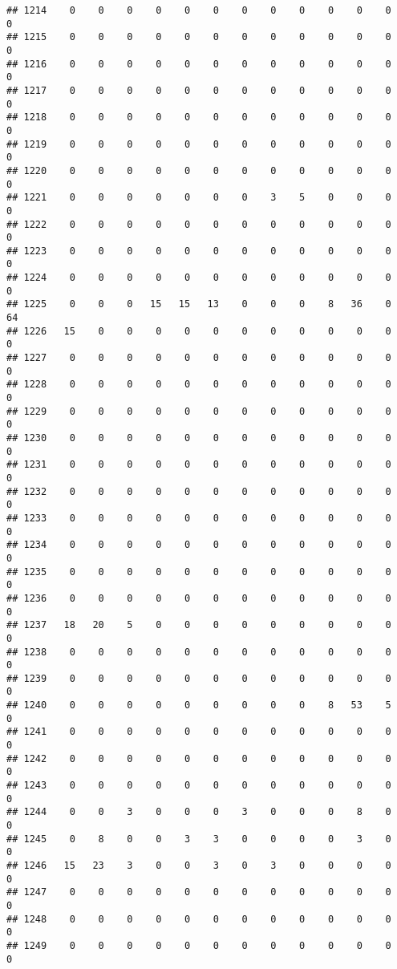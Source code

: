 \documentclass[]{article}
\begin{document}
\begin{verbatim}
## 1214    0    0    0    0    0    0    0    0    0    0    0    0    0
## 1215    0    0    0    0    0    0    0    0    0    0    0    0    0
## 1216    0    0    0    0    0    0    0    0    0    0    0    0    0
## 1217    0    0    0    0    0    0    0    0    0    0    0    0    0
## 1218    0    0    0    0    0    0    0    0    0    0    0    0    0
## 1219    0    0    0    0    0    0    0    0    0    0    0    0    0
## 1220    0    0    0    0    0    0    0    0    0    0    0    0    0
## 1221    0    0    0    0    0    0    0    3    5    0    0    0    0
## 1222    0    0    0    0    0    0    0    0    0    0    0    0    0
## 1223    0    0    0    0    0    0    0    0    0    0    0    0    0
## 1224    0    0    0    0    0    0    0    0    0    0    0    0    0
## 1225    0    0    0   15   15   13    0    0    0    8   36    0   64
## 1226   15    0    0    0    0    0    0    0    0    0    0    0    0
## 1227    0    0    0    0    0    0    0    0    0    0    0    0    0
## 1228    0    0    0    0    0    0    0    0    0    0    0    0    0
## 1229    0    0    0    0    0    0    0    0    0    0    0    0    0
## 1230    0    0    0    0    0    0    0    0    0    0    0    0    0
## 1231    0    0    0    0    0    0    0    0    0    0    0    0    0
## 1232    0    0    0    0    0    0    0    0    0    0    0    0    0
## 1233    0    0    0    0    0    0    0    0    0    0    0    0    0
## 1234    0    0    0    0    0    0    0    0    0    0    0    0    0
## 1235    0    0    0    0    0    0    0    0    0    0    0    0    0
## 1236    0    0    0    0    0    0    0    0    0    0    0    0    0
## 1237   18   20    5    0    0    0    0    0    0    0    0    0    0
## 1238    0    0    0    0    0    0    0    0    0    0    0    0    0
## 1239    0    0    0    0    0    0    0    0    0    0    0    0    0
## 1240    0    0    0    0    0    0    0    0    0    8   53    5    0
## 1241    0    0    0    0    0    0    0    0    0    0    0    0    0
## 1242    0    0    0    0    0    0    0    0    0    0    0    0    0
## 1243    0    0    0    0    0    0    0    0    0    0    0    0    0
## 1244    0    0    3    0    0    0    3    0    0    0    8    0    0
## 1245    0    8    0    0    3    3    0    0    0    0    3    0    0
## 1246   15   23    3    0    0    3    0    3    0    0    0    0    0
## 1247    0    0    0    0    0    0    0    0    0    0    0    0    0
## 1248    0    0    0    0    0    0    0    0    0    0    0    0    0
## 1249    0    0    0    0    0    0    0    0    0    0    0    0    0

\end{verbatim}
\end{document}
